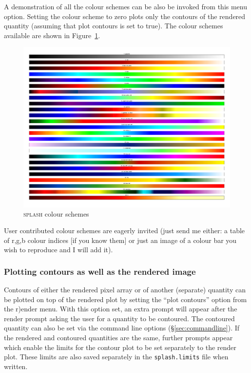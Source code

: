 \documentclass[a4paper,10pt]{article}
\newcommand{\splash}{\textsc{splash }}
\begin{document}
 A demonstration of all the colour schemes can be also be invoked from
this menu option. Setting the colour scheme to zero plots only the contours of
the rendered quantity (assuming that plot contours is set to true). The colour
schemes available are shown in Figure~\ref{fig:colourschemes}.
\begin{figure}
\begin{center}
\includegraphics[angle=270,width=\textwidth]{colourschemes.pdf}
\caption{\splash colour schemes}
\label{fig:colourschemes}
\end{center}
\end{figure}

 User contributed colour schemes are eagerly invited (just send me either: a table of r,g,b colour indices [if you know them] or just an image of a colour bar you wish to reproduce and I will add it).

\subsubsection{ Plotting contours as well as the rendered image}
 Contours of either the rendered pixel array or of another (separate) quantity can be plotted on top of the rendered plot by setting the ``plot contours'' option from the r)ender menu. With this option set, an extra prompt will appear after the render prompt asking the user for a quantity to be contoured. The contoured quantity can also be set via the command line options (\S\ref{sec:commandline}). If the rendered and contoured quantities are the same, further prompts appear which enable the limits for the contour plot to be set separately to the render plot. These limits are also saved separately in the \verb+splash.limits+ file when written.
 
\end{document}
